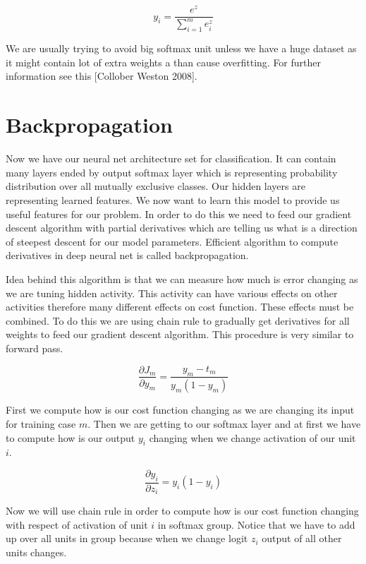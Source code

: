 \begin{equation}
y_i = \frac{e^z}{\sum\limits_{i=1}^m e^z_i}
\end{equation}

We are usually trying to avoid big softmax unit unless we have a huge dataset as it might contain lot of extra weights a than cause overfitting. For further information see this [Collober Weston 2008].

\section{Backpropagation}
Now we have our neural net architecture set for classification. It can contain many layers ended by output softmax layer which is representing probability distribution over all mutually exclusive classes. Our hidden layers are representing learned features. We now want to learn this model to provide us useful features for our problem. In order to do this we need to feed our gradient descent algorithm with partial derivatives which are telling us what is a direction of steepest descent for our model parameters. Efficient algorithm to compute derivatives in deep neural net is called backpropagation.

Idea behind this algorithm is that we can measure how much is error changing as we are tuning hidden activity. This activity can have various effects on other activities therefore many different effects on cost function. These effects must be combined. To do this we are using chain rule to gradually get derivatives for all weights to feed our gradient descent algorithm. This procedure is very similar to forward pass.

\begin{equation}
\frac{\partial J_m}{\partial y_m} = \frac{y_m - t_m}{y_m (1 - y_m)}
\end{equation}

First we compute how is our cost function changing as we are changing its input for training case \(m\). Then we are getting to our softmax layer and at first we have to compute how is our output \(y_i\) changing when we change activation of our unit \(i\).

\begin{equation}
\frac{\partial y_i}{\partial z_i} = y_i (1 - y_i)
\end{equation}

Now we will use chain rule in order to compute how is our cost function changing with respect of activation of unit \(i\) in softmax group.  Notice that we have to add up over all units in group because when we change logit \(z_i\) output of all other units changes.

